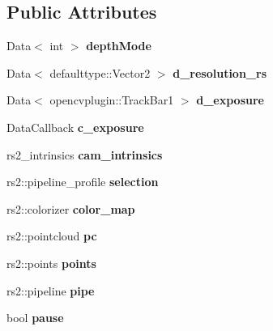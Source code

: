 \subsection*{Public Attributes}
\begin{DoxyCompactItemize}
\item 
\mbox{\label{classsofa_1_1rgbdtracking_1_1_real_sense_cam_a44e727c66935e408f2ba4de6e0699b6b}} 
Data$<$ int $>$ {\bfseries depth\+Mode}
\item 
\mbox{\label{classsofa_1_1rgbdtracking_1_1_real_sense_cam_a3c62e27c86ce60e15cc8b520fe576994}} 
Data$<$ defaulttype\+::\+Vector2 $>$ {\bfseries d\+\_\+resolution\+\_\+rs}
\item 
\mbox{\label{classsofa_1_1rgbdtracking_1_1_real_sense_cam_ad605d7bbc20faee2b716df53474412dc}} 
Data$<$ opencvplugin\+::\+Track\+Bar1 $>$ {\bfseries d\+\_\+exposure}
\item 
\mbox{\label{classsofa_1_1rgbdtracking_1_1_real_sense_cam_a67ec547de6f69bebef2a7f2e8d584f48}} 
Data\+Callback {\bfseries c\+\_\+exposure}
\item 
\mbox{\label{classsofa_1_1rgbdtracking_1_1_real_sense_cam_a07b608dff4127a1ea22ffcc93a0a2b8b}} 
rs2\+\_\+intrinsics {\bfseries cam\+\_\+intrinsics}
\item 
\mbox{\label{classsofa_1_1rgbdtracking_1_1_real_sense_cam_a9c40355cbe2db5d7ccd20a6ff3d6c8d2}} 
rs2\+::pipeline\+\_\+profile {\bfseries selection}
\item 
\mbox{\label{classsofa_1_1rgbdtracking_1_1_real_sense_cam_a8763304f41d3eb3ecd0a9c8fc92a1bac}} 
rs2\+::colorizer {\bfseries color\+\_\+map}
\item 
\mbox{\label{classsofa_1_1rgbdtracking_1_1_real_sense_cam_a622f15e0a08312b92571bd5c4d040ea1}} 
rs2\+::pointcloud {\bfseries pc}
\item 
\mbox{\label{classsofa_1_1rgbdtracking_1_1_real_sense_cam_a4fbb2690c02fea1635913680e08efd7b}} 
rs2\+::points {\bfseries points}
\item 
\mbox{\label{classsofa_1_1rgbdtracking_1_1_real_sense_cam_a630e600956571e553972403bba7fcf02}} 
rs2\+::pipeline {\bfseries pipe}
\item 
\mbox{\label{classsofa_1_1rgbdtracking_1_1_real_sense_cam_a9fce91c3e7d2c1be3aaca521ea28d14f}} 
bool {\bfseries pause}
\end{DoxyCompactItemize}
